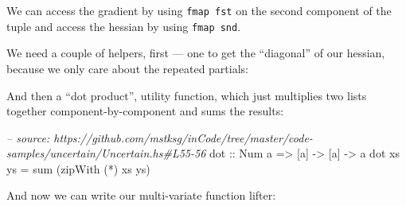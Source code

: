 \documentclass[]{article}
\newenvironment{Shaded}{}{}
\newcommand{\KeywordTok}[1]{\textcolor[rgb]{0.00,0.44,0.13}{\textbf{#1}}}
\newcommand{\DataTypeTok}[1]{\textcolor[rgb]{0.56,0.13,0.00}{#1}}
\newcommand{\DecValTok}[1]{\textcolor[rgb]{0.25,0.63,0.44}{#1}}
\newcommand{\CommentTok}[1]{\textcolor[rgb]{0.38,0.63,0.69}{\textit{#1}}}
\newcommand{\OtherTok}[1]{\textcolor[rgb]{0.00,0.44,0.13}{#1}}
\newcommand{\FunctionTok}[1]{\textcolor[rgb]{0.02,0.16,0.49}{#1}}
\newcommand{\NormalTok}[1]{#1}
\begin{document}
We can access the gradient by using \texttt{fmap\ fst} on the second component
of the tuple and access the hessian by using \texttt{fmap\ snd}.

We need a couple of helpers, first --- one to get the ``diagonal'' of our
hessian, because we only care about the repeated partials:

\begin{Shaded}
\end{Shaded}

And then a ``dot product'', utility function, which just multiplies two lists
together component-by-component and sums the results:

\begin{Shaded}
\begin{Highlighting}[]
\CommentTok{-- source: https://github.com/mstksg/inCode/tree/master/code-samples/uncertain/Uncertain.hs#L55-56}
\OtherTok{dot ::} \DataTypeTok{Num}\NormalTok{ a }\OtherTok{=>}\NormalTok{ [a] }\OtherTok{->}\NormalTok{ [a] }\OtherTok{->}\NormalTok{ a}
\NormalTok{dot xs ys }\FunctionTok{=}\NormalTok{ sum (zipWith (}\FunctionTok{*}\NormalTok{) xs ys)}
\end{Highlighting}
\end{Shaded}

And now we can write our multi-variate function lifter:
\end{document}
